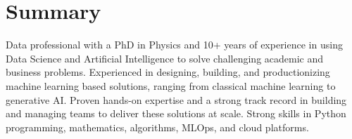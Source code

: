 \documentclass[10pt,a4paper,sans]{moderncv}        %
\begin{document}
\makecvtitle


\section{Summary}
Data professional with a PhD in Physics and 10+ years of experience in using Data Science and Artificial Intelligence to solve challenging academic and business problems.\newline{}
Experienced in designing, building, and productionizing machine learning based solutions, ranging from classical machine learning to generative AI. Proven hands-on expertise and a strong track record in building and managing teams to deliver these solutions at scale.
\newline{}
Strong skills in Python programming, mathematics, algorithms, MLOps, and cloud platforms.
\vspace{0.5em}
\end{document}
